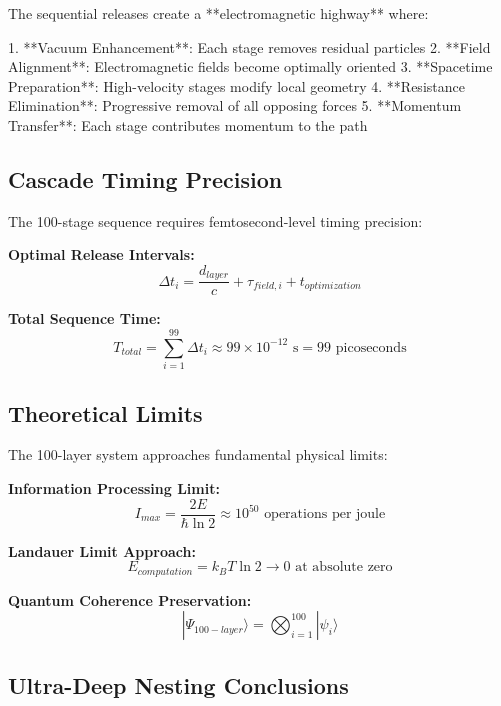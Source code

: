 \documentclass[12pt,a4paper]{article}
\begin{document}
The sequential releases create a **electromagnetic highway** where:

1. **Vacuum Enhancement**: Each stage removes residual particles
2. **Field Alignment**: Electromagnetic fields become optimally oriented
3. **Spacetime Preparation**: High-velocity stages modify local geometry
4. **Resistance Elimination**: Progressive removal of all opposing forces
5. **Momentum Transfer**: Each stage contributes momentum to the path

\subsection{Cascade Timing Precision}

The 100-stage sequence requires femtosecond-level timing precision:

\textbf{Optimal Release Intervals:}
\begin{equation}
\Delta t_{i} = \frac{d_{layer}}{c} + \tau_{field,i} + t_{optimization}
\end{equation}

\textbf{Total Sequence Time:}
\begin{equation}
T_{total} = \sum_{i=1}^{99} \Delta t_i \approx 99 \times 10^{-12} \text{ s} = 99 \text{ picoseconds}
\end{equation}

\subsection{Theoretical Limits}

The 100-layer system approaches fundamental physical limits:

\textbf{Information Processing Limit:}
\begin{equation}
I_{max} = \frac{2E}{\hbar \ln 2} \approx 10^{50} \text{ operations per joule}
\end{equation}

\textbf{Landauer Limit Approach:}
\begin{equation}
E_{computation} = k_B T \ln 2 \rightarrow 0 \text{ at absolute zero}
\end{equation}

\textbf{Quantum Coherence Preservation:}
\begin{equation}
|\Psi_{100-layer}\rangle = \bigotimes_{i=1}^{100} |\psi_i\rangle
\end{equation}

\subsection{Ultra-Deep Nesting Conclusions}
\end{document}
